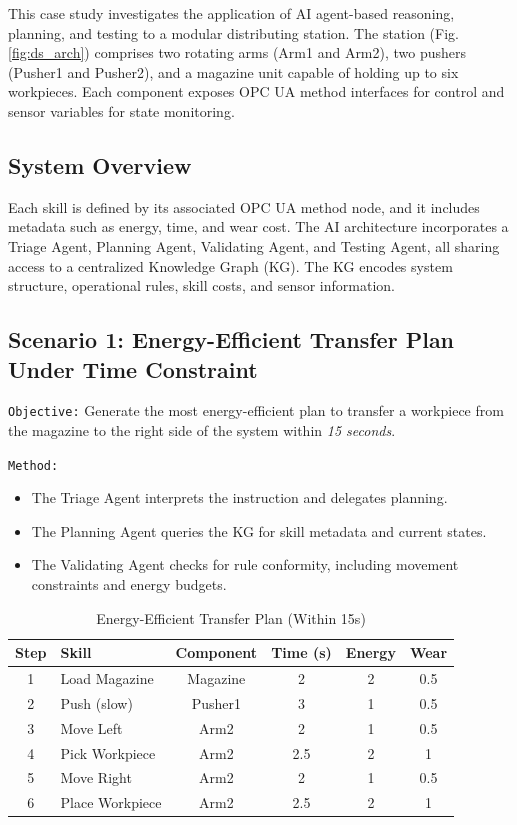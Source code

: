 \documentclass[conference]{IEEEtran}
\begin{document}
This case study investigates the application of AI agent-based reasoning, planning, and testing to a modular distributing station. The station (Fig. \ref{fig:ds_arch}) comprises two rotating arms (Arm1 and Arm2), two pushers (Pusher1 and Pusher2), and a magazine unit capable of holding up to six workpieces. Each component exposes OPC UA method interfaces for control and sensor variables for state monitoring.

\subsection{System Overview}
Each skill is defined by its associated OPC UA method node, and it includes metadata such as energy, time, and wear cost. The AI architecture incorporates a Triage Agent, Planning Agent, Validating Agent, and Testing Agent, all sharing access to a centralized Knowledge Graph (KG). The KG encodes system structure, operational rules, skill costs, and sensor information.

\subsection{Scenario 1: Energy-Efficient Transfer Plan Under Time Constraint}

\texttt{Objective:} Generate the most energy-efficient plan to transfer a workpiece from the magazine to the right side of the system within \textit{15 seconds}.

\texttt{Method:}
\begin{itemize}
    \item The Triage Agent interprets the instruction and delegates planning.
    \item The Planning Agent queries the KG for skill metadata and current states.
    \item The Validating Agent checks for rule conformity, including movement constraints and energy budgets.
\end{itemize}

\begin{table}[h]
\centering
\caption{Energy-Efficient Transfer Plan (Within 15s)}
\begin{tabular}{|c|l|c|c|c|c|}
\hline
\textbf{Step} & \textbf{Skill} & \textbf{Component} & \textbf{Time (s)} & \textbf{Energy} & \textbf{Wear} \\
\hline
1 & Load Magazine & Magazine & 2 & 2 & 0.5 \\
2 & Push (slow) & Pusher1 & 3 & 1 & 0.5 \\
3 & Move Left & Arm2 & 2 & 1 & 0.5 \\
4 & Pick Workpiece & Arm2 & 2.5 & 2 & 1 \\
5 & Move Right & Arm2 & 2 & 1 & 0.5 \\
6 & Place Workpiece & Arm2 & 2.5 & 2 & 1 \\
\hline
\end{tabular}
\label{tab:transfer_plan}
\end{table}
\end{document}
